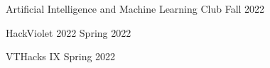 Artificial Intelligence and Machine Learning Club \hfill Fall 2022

HackViolet 2022 \hfill Spring 2022

VTHacks IX \hfill Spring 2022









